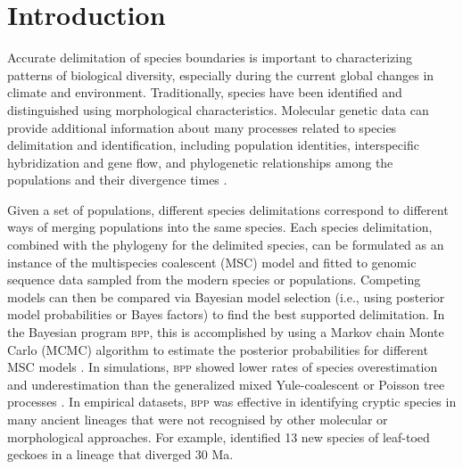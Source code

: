 \documentclass[A4]{article1}
\begin{document}
\maketitle


\section{Introduction}

Accurate delimitation of species boundaries is important to characterizing patterns of
biological diversity, especially during the current global changes in climate and
environment.  Traditionally, species have been identified and distinguished using
morphological characteristics.  Molecular genetic data can provide additional
information about many processes related to species delimitation and identification,
including population identities, interspecific hybridization and gene flow, and
phylogenetic relationships among the populations and their divergence times
\citep{Jiao2021MSC}.

Given a set of populations, different species delimitations correspond to different ways
of merging populations into the same species.  Each species delimitation, combined with
the phylogeny for the delimited species, can be formulated as an instance of the
multispecies coalescent (MSC) model \citep{Rannala2003} and fitted to genomic sequence
data sampled from the modern species or populations.  Competing models can then be
compared via Bayesian model selection (i.e., using posterior model probabilities or
Bayes factors) to find the best supported delimitation.  In the Bayesian program
\textsc{bpp}, this is accomplished by using a Markov chain Monte Carlo (MCMC) algorithm
to estimate the posterior probabilities for different MSC models \citep{Yang2010,
   Yang2014, Yang2015, Flouri2018}. In simulations, \textsc{bpp} showed lower rates of
species overestimation and underestimation than the generalized mixed Yule-coalescent or
Poisson tree processes \citep{Luo2018}.  In empirical datasets, \textsc{bpp} was
effective in identifying cryptic species in many ancient lineages that were not
recognised by other molecular or morphological approaches.  For example,
\cite{Ramirez-Reyes2020} identified 13 new species of leaf-toed geckoes in a lineage
that diverged 30 Ma.
\end{document}
